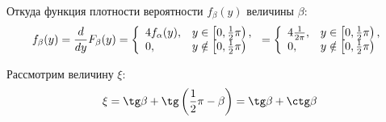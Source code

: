 Откуда функция плотности вероятности $f_\beta(y)$ величины $\beta$:
\begin{equation}
    f_\beta(y) = \frac{d}{dy} F_\beta(y)
    = \left \{
    \begin{array}{ll}
        4 f_\alpha(y), & y \in \left [ 0, \frac{1}{2} \pi \right ),   \\
        0,             & y \notin \left [ 0, \frac{1}{2} \pi \right )
    \end{array}
    \right .
    = \left \{
    \begin{array}{ll}
        4 \frac{1}{2 \pi}, & y \in \left [ 0, \frac{1}{2} \pi \right ),   \\
        0,                 & y \notin \left [ 0, \frac{1}{2} \pi \right )
    \end{array}
    \right .
\end{equation}

Рассмотрим величину $\xi$:
\begin{equation}
    \xi = \tg \beta + \tg \left ( \frac{1}{2} \pi - \beta \right ) = \tg \beta + \ctg \beta
\end{equation}

